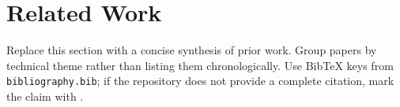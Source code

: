 \section{Related Work}
\label{sec:related_work}

Replace this section with a concise synthesis of prior work. Group papers by technical theme rather than listing them chronologically. Use BibTeX keys from \texttt{bibliography.bib}; if the repository does not provide a complete citation, mark the claim with .
